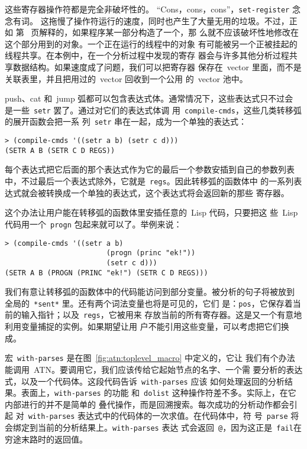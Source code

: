 这些寄存器操作符都是完全非破坏性的。
``Cons，cons，cons''，\texttt{set-register} 念念有词。
这拖慢了操作符运行的速度，同时也产生了大量无用的垃圾。不过，正如
第~\pageref{share-between-continuations} 页解释的，如果程序某一部分构造了一个\continuation{}，那
么就不应该破坏性地修改在这个部分用到的对象。一个正在运行的线程中的对象
有可能被另一个正被挂起的线程共享。在本例中，在一个分析过程中发现的寄存
器会与许多其他分析过程共享数据结构。如果速度成了问题，我们可以把寄存器
保存在~vector 里面，而不是关联表里，并且把用过的~vector 回收到一个公用
的~vector 池中。

push、cat 和~jump 弧都可以包含表达式体。通常情况下，这些表达式只不过会
是一些~\texttt{setr} 罢了。通过对它们的表达式体调
用~\texttt{compile-cmds}，这些几类转移弧的展开函数会把一系
列~\texttt{setr} 串在一起，成为一个单独的表达式：
\begin{lstlisting}
> (compile-cmds '((setr a b) (setr c d)))
(SETR A B (SETR C D REGS))
\end{lstlisting}
每个表达式把它后面的那个表达式作为它的最后一个参数安插到自己的参数列表
中，不过最后一个表达式除外，它就是~\texttt{regs}。因此转移弧的函数体中
的一系列表达式就会被转换成一个单独的表达式，这个表达式将会返回新的那些
寄存器。

这个办法让用户能在转移弧的函数体里安插任意的~Lisp 代码，只要把这
些~Lisp 代码用一个~\texttt{progn} 包起来就可以了。举例来说：

\begin{lstlisting}
> (compile-cmds '((setr a b)
                        (progn (princ "ek!"))
                        (setr c d)))
(SETR A B (PROGN (PRINC "ek!") (SETR C D REGS)))
\end{lstlisting}

我们有意让转移弧的函数体中的代码能访问到部分变量。被分析的句子将被放到
全局的~\texttt{*sent*} 里。还有两个词法变量也将是可见的，它们
是：\texttt{pos}，它保存着当前的输入指针；以及~\texttt{regs}，它被用来
存放当前的所有寄存器。这是又一个有意地利用变量捕捉的实例。如果期望让用
户不能引用这些变量，可以考虑把它们换成\gensym。

宏~\texttt{with-parses} 是在图~\ref{fig:atn:toplevel_macro} 中定义的，它让
我们有个办法能调用~\textsc{ATN}。要调用它，我们应该传给它起始节点的名字、一个需
要分析的表达式，以及一个代码体。这段代码告诉~\texttt{with-parses} 应该
如何处理返回的分析结果。表面上，\texttt{with-parses} 的功能
和~\texttt{dolist} 这种操作符差不多。实际上，在它内部进行的并不是简单的
叠代操作，而是回溯搜索。每次成功的分析动作都会引起
对~\texttt{with-parses} 表达式中的代码体的一次求值。在代码体中，符
号~\texttt{parse} 将会绑定到当前的分析结果上。\texttt{with-parses} 表达
式会返回~\texttt{@}，因为这正是~\texttt{fail}在穷途末路时的返回值。

